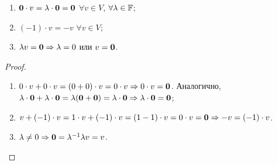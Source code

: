 \begin{proposal}
    \begin{enumerate}[nolistsep]
        \item $\boldsymbol{0} \cdot v = \lambda \cdot \boldsymbol{0} = \boldsymbol{0}$ $\forall v \in V$, $\forall \lambda \in \mathbb{F}$;
        \item $(-1) \cdot v = -v$ $\forall v \in V$;
        \item $\lambda v = \boldsymbol{0} \Rightarrow \lambda = 0$ или $v = \boldsymbol{0}$.
    \end{enumerate}
\end{proposal}

\begin{proof}
    \begin{enumerate}[nolistsep]
        \item $0 \cdot v + 0 \cdot v = (0 + 0) \cdot v = 0 \cdot v \Rightarrow 0 \cdot v = \boldsymbol{0}$. Аналогично, $\lambda \cdot \boldsymbol{0} + \lambda \cdot \boldsymbol{0} = \lambda(\boldsymbol{0} + \boldsymbol{0}) = \lambda \cdot \boldsymbol{0} \Rightarrow \lambda \cdot \boldsymbol{0} = \boldsymbol{0}$;
        \item $v + (-1) \cdot v = 1 \cdot v + (-1) \cdot v = (1 - 1) \cdot v = 0 \cdot v = \boldsymbol{0} \Rightarrow -v = (-1) \cdot v$.
        \item $\lambda \ne 0 \Rightarrow \boldsymbol{0} = \lambda^{-1}\lambda v = v$.
    \end{enumerate}
\end{proof}

